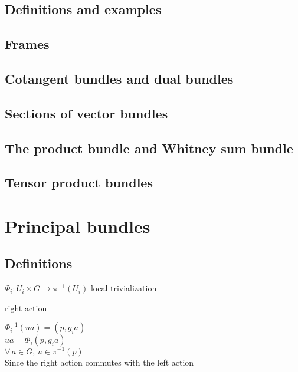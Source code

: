 \documentclass{book}
\begin{document}
\subsection{ Definitions and examples }



\subsection{ Frames }


\subsection{ Cotangent bundles and dual bundles }



\subsection{ Sections of vector bundles }



\subsection{ The product bundle and Whitney sum bundle }



\subsection{ Tensor product bundles }




\section{ Principal bundles }




\subsection{ Definitions }

$\Phi_i: U_i \times G \to \pi^{-1}(U_i)$ local trivialization

right action

$\Phi_i^{-1}(ua) = (p,g_i a) $ \\
$ua = \Phi_i(p,g_i a)$ \\
$\forall \, a \in G, \, u \in \pi^{-1}(p)$ \\

Since the right action commutes with the left action  
\end{document}
